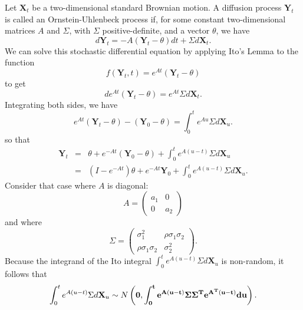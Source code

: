 \documentclass[12pt]{article}
\begin{document}
Let $\textbf{X}_t$ be a two-dimensional standard Brownian motion.  A diffusion process $\textbf{Y}_t$ is called an
Ornstein-Uhlenbeck process if, for some constant two-dimensional matrices $A$ and $\Sigma$, with $\Sigma$
positive-definite, and a vector $\theta$, we have
\begin{equation*}
d \textbf{Y}_t = -A (\textbf{Y}_t - \theta) dt + \Sigma d \textbf{X}_t.
\end{equation*}
We can solve this stochastic differential equation by applying Ito's Lemma to the function
\begin{equation*}
f(\textbf{Y}_t,t) = e^{At} ( \textbf{Y}_t - \theta)
\end{equation*}
to get
\begin{equation*}
d e^{At} ( \textbf{Y}_t - \theta) = e^{At}\Sigma d \textbf{X}_t .
\end{equation*}
Integrating both sides, we have
\begin{equation*}
 e^{At} ( \textbf{Y}_t - \theta) - (\textbf{Y}_0 - \theta) = \int_{0}^{t}  e^{Au}\Sigma d \textbf{X}_u .
\end{equation*}
so that
\begin{eqnarray*}
  \textbf{Y}_t & = & \theta + e^{-At} (\textbf{Y}_0 - \theta) + \int_{0}^{t}  e^{A(u-t)}\Sigma d \textbf{X}_u \\
  & = & ( I - e^{-At} ) \theta + e^{-At}\textbf{Y}_0 + \int_{0}^{t}  e^{A(u-t)}\Sigma d \textbf{X}_u .
\end{eqnarray*}
Consider that case where $A$ is diagonal:
\begin{equation*}
A =  \left( \begin{array}{cc}
a_1 & 0  \\
0 & a_2  \end{array} \right)
\end{equation*}
and where
\begin{equation*}
\Sigma =  \left( \begin{array}{cc}
\sigma_1^2 & \rho \sigma_1 \sigma_2  \\
\rho \sigma_1 \sigma_2 & \sigma_2^2  \end{array} \right) .
\end{equation*}
Because the integrand of the Ito integral $\int_{0}^{t}  e^{A(u-t)}\Sigma d \textbf{X}_u$ is non-random, it follows that
\begin{equation*}
\int_{0}^{t}  e^{A(u-t)}\Sigma d \textbf{X}_u \sim N \left( \bf{0}, \int_{0}^{t}  e^{A(u-t)}\Sigma \Sigma^T e^{A^T (u-t)} du    \right) .
\end{equation*}
\end{document}
